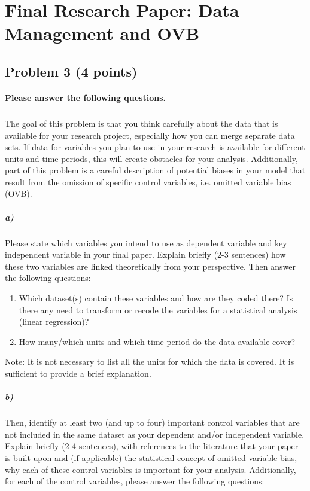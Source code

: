 \documentclass[12pt]{article}
\begin{document}
\section*{Final Research Paper: Data Management and OVB}

\subsection*{Problem 3 (4 points)}

\paragraph{Please answer the following questions.}

\subparagraph{} The goal of this problem is that you think carefully about the data that is available for your research project, especially how you can merge separate data sets. If data for variables you plan to use in your research is available for different units and time periods, this will create obstacles for your analysis. Additionally, part of this problem is a careful description of potential biases in your model that result from the omission of specific control variables, i.e. omitted variable bias (OVB).

\subparagraph{a)} Please state which variables you intend to use as dependent variable and key independent variable in your final paper. Explain briefly (2-3 sentences) how these two variables are linked theoretically from your perspective. Then answer the following questions:

\begin{enumerate}
	\item Which dataset(s) contain these variables and how are they coded there? Is there any need to transform or recode the variables for a statistical analysis (linear regression)?
	\item How many/which units and which time period do the data available cover?
\end{enumerate}

Note: It is not necessary to list all the units for which the data is covered. It is sufficient to provide a brief explanation.

\subparagraph{b)} Then, identify at least two (and up to four) important control variables that are not included in the same dataset as your dependent and/or independent variable. Explain briefly (2-4 sentences), with references to the literature that your paper is built upon and (if applicable) the statistical concept of omitted variable bias, why each of these control variables is important for your analysis. Additionally, for each of the control variables, please answer the following questions:
\end{document}
